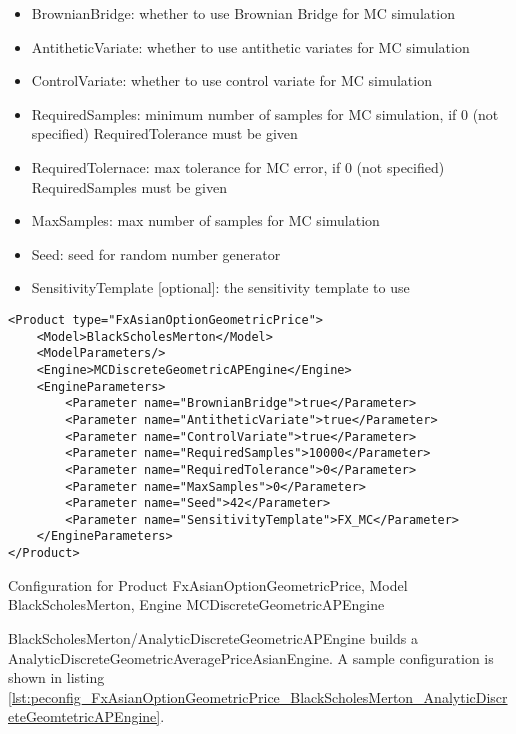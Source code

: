 \begin{itemize}
\item BrownianBridge: whether to use Brownian Bridge for MC simulation
\item AntitheticVariate: whether to use antithetic variates for MC simulation
\item ControlVariate: whether to use control variate for MC simulation
\item RequiredSamples: minimum number of samples for MC simulation, if 0 (not specified) RequiredTolerance must be given
\item RequiredTolernace: max tolerance for MC error, if 0 (not specified) RequiredSamples must be given
\item MaxSamples: max number of samples for MC simulation
\item Seed: seed for random number generator
\item SensitivityTemplate [optional]: the sensitivity template to use 
\end{itemize}

\begin{longlisting}
\begin{verbatim}
<Product type="FxAsianOptionGeometricPrice">
    <Model>BlackScholesMerton</Model>
    <ModelParameters/>
    <Engine>MCDiscreteGeometricAPEngine</Engine>
    <EngineParameters>
        <Parameter name="BrownianBridge">true</Parameter>    
        <Parameter name="AntitheticVariate">true</Parameter>    
        <Parameter name="ControlVariate">true</Parameter>    
        <Parameter name="RequiredSamples">10000</Parameter>    
        <Parameter name="RequiredTolerance">0</Parameter>    
        <Parameter name="MaxSamples">0</Parameter>    
        <Parameter name="Seed">42</Parameter>    
        <Parameter name="SensitivityTemplate">FX_MC</Parameter>
    </EngineParameters>
</Product>
\end{verbatim}
\caption{Configuration for Product FxAsianOptionGeometricPrice, Model BlackScholesMerton, Engine MCDiscreteGeometricAPEngine}
\label{lst:peconfig_FxAsianOptionGeometricPrice_BlackScholesMerton_MCDiscreteGeomtetricAPEngine}
\end{longlisting}

BlackScholesMerton/AnalyticDiscreteGeometricAPEngine builds a AnalyticDiscreteGeometricAveragePriceAsianEngine. A sample
configuration is shown in listing
\ref{lst:peconfig_FxAsianOptionGeometricPrice_BlackScholesMerton_AnalyticDiscreteGeomtetricAPEngine}.

